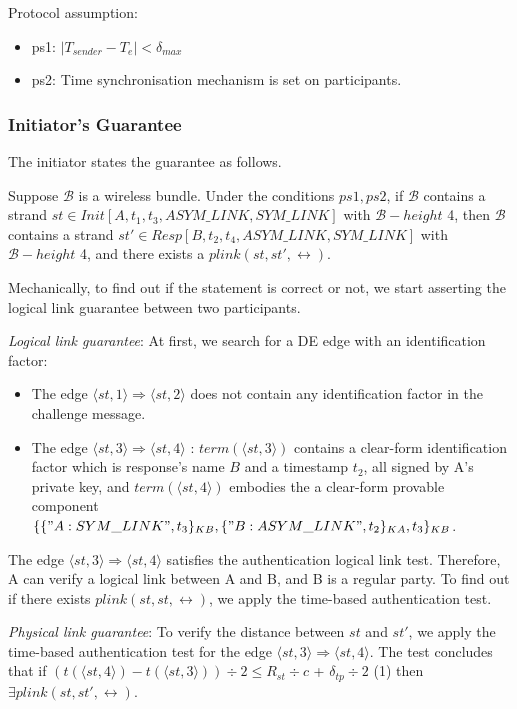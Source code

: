 Protocol assumption: 
\begin{itemize}
\item ps1: $|T_{sender} - T_e| < \delta_{max}$
\item ps2: Time synchronisation mechanism is set on participants.
\end{itemize}

\subsubsection*{Initiator's Guarantee} 

The initiator states the guarantee as follows.

Suppose $\mathcal{B}$ is a wireless bundle. Under the conditions $ps1, ps2$, if $\mathcal{B}$ contains a strand $st \in Init[A,t_1,t_3,ASYM\_LINK, SYM\_LINK]$ with $\mathcal{B} -height$ 4, then $\mathcal{B}$ contains a strand $st' \in Resp[B,t_2,t_4,ASYM\_LINK, SYM\_LINK]$ with $\mathcal{B} -height$ 4, and there exists a $plink(st,st',\leftrightarrow)$. 

Mechanically, to find out if the statement is correct or not, we start asserting the logical link guarantee between two participants. 
 
\emph{Logical link guarantee}: At first, we search for a DE edge with an identification factor:
\begin{itemize}
\item The edge $\langle st, 1 \rangle \Rightarrow \langle st, 2 \rangle$ does not contain any identification factor in the challenge message. 
\item The edge $\langle st, 3 \rangle \Rightarrow \langle st, 4 \rangle$ : $term(\langle st, 3 \rangle)$ contains a clear-form identification factor which is response's name $B$ and a timestamp $t_2$, all signed by A's private key, and $term(\langle st, 4 \rangle)$ embodies the a clear-form provable component $\{\{ "A:SYM\_LINK", t_3\}_{KB} ,\{ "B:ASYM\_LINK",t_2\}_{KA} ,t_3\}_{KB}$.
\end{itemize}

The edge $\langle st, 3 \rangle \Rightarrow \langle st, 4 \rangle$ satisfies the authentication logical link test. Therefore, A can verify a logical link between A and B, and B is a regular party. To find out if there exists $plink(st,st,\leftrightarrow)$, we apply the time-based authentication test. 

\emph{Physical link guarantee}: To verify the distance between $st$ and $st'$, we apply the time-based authentication test for the edge $\langle st, 3 \rangle \Rightarrow \langle st, 4 \rangle$. The test concludes that if $(t(\langle st, 4 \rangle) - t(\langle st, 3 \rangle)) \div 2 \le R_{st} \div c$ + $\delta_{tp} \div 2$ (1) then $\exists plink(st,st', \leftrightarrow)$. 

